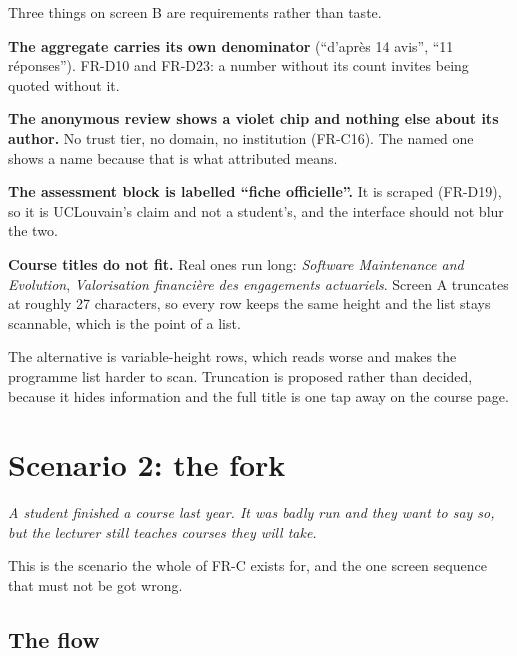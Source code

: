 \documentclass[11pt,a4paper]{article}
\begin{document}
\begin{why}
Three things on screen B are requirements rather than taste.

\textbf{The aggregate carries its own denominator} (``d'apr\`es 14 avis'',
``11 r\'eponses''). FR-D10 and FR-D23: a number without its count invites being
quoted without it.

\textbf{The anonymous review shows a violet chip and nothing else about its
author.} No trust tier, no domain, no institution (FR-C16). The named one shows
a name because that is what attributed means.

\textbf{The assessment block is labelled ``fiche officielle''.} It is scraped
(FR-D19), so it is UCLouvain's claim and not a student's, and the interface
should not blur the two.
\end{why}

\begin{openq}
\textbf{Course titles do not fit.} Real ones run long: \emph{Software
Maintenance and Evolution}, \emph{Valorisation financi\`ere des engagements
actuariels}. Screen A truncates at roughly 27 characters, so every row keeps the
same height and the list stays scannable, which is the point of a list.

The alternative is variable-height rows, which reads worse and makes the
programme list harder to scan. Truncation is proposed rather than decided,
because it hides information and the full title is one tap away on the course
page.
\end{openq}


\newpage
\section{Scenario 2: the fork}

\textit{A student finished a course last year. It was badly run and they want to
say so, but the lecturer still teaches courses they will take.}

This is the scenario the whole of FR-C exists for, and the one screen sequence
that must not be got wrong.

\subsection{The flow}
\end{document}
